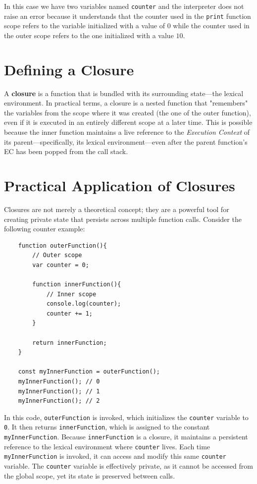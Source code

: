 \documentclass{scrbook}
\begin{document}
In this case we have two variables named \texttt{counter} and the interpreter does not raise an error because it understands that the counter used in the \texttt{print} function scope refers to the variable initialized with a value of $0$ while the counter used in the outer scope refers to the one initialized with a value $10$.

\section{Defining a Closure}

A \textbf{closure} is a function that is bundled with its surrounding state—the lexical environment. In practical terms, a closure is a nested function that "remembers" the variables from the scope where it was created (the one of the outer function), even if it is executed in an entirely different scope at a later time. This is possible because the inner function maintains a live reference to the \textit{Execution Context} of its parent—specifically, its lexical environment—even after the parent function's EC has been popped from the call stack.

\section{Practical Application of Closures}

Closures are not merely a theoretical concept; they are a powerful tool for creating private state that persists across multiple function calls. Consider the following counter example:

\begin{lstlisting}
    function outerFunction(){
        // Outer scope
        var counter = 0;
        
        function innerFunction(){
            // Inner scope
            console.log(counter);
            counter += 1;
        }
        
        return innerFunction;
    }
    
    const myInnerFunction = outerFunction();
    myInnerFunction(); // 0
    myInnerFunction(); // 1
    myInnerFunction(); // 2
\end{lstlisting}

In this code, \texttt{outerFunction} is invoked, which initializes the \texttt{counter} variable to \texttt{0}. It then returns \texttt{innerFunction}, which is assigned to the constant \texttt{myInnerFunction}. Because \texttt{innerFunction} is a closure, it maintains a persistent reference to the lexical environment where \texttt{counter} lives. Each time \texttt{myInnerFunction} is invoked, it can access and modify this same \texttt{counter} variable. The \texttt{counter} variable is effectively private, as it cannot be accessed from the global scope, yet its state is preserved between calls. \\
\end{document}
